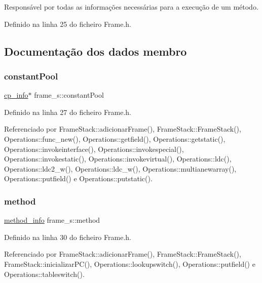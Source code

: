 Responsável por todas as informações necessárias para a execução de um método. 

Definido na linha 25 do ficheiro Frame.\+h.



\subsection{Documentação dos dados membro}
\mbox{\label{structframe__s_a13764e54bdd2ba069584ea6626590efe}} 
\subsubsection{\texorpdfstring{constant\+Pool}{constantPool}}
{\footnotesize\ttfamily \hyperlink{structcp__info}{cp\+\_\+info}$\ast$ frame\+\_\+s\+::constant\+Pool}



Definido na linha 27 do ficheiro Frame.\+h.



Referenciado por Frame\+Stack\+::adicionar\+Frame(), Frame\+Stack\+::\+Frame\+Stack(), Operations\+::func\+\_\+new(), Operations\+::getfield(), Operations\+::getstatic(), Operations\+::invokeinterface(), Operations\+::invokespecial(), Operations\+::invokestatic(), Operations\+::invokevirtual(), Operations\+::ldc(), Operations\+::ldc2\+\_\+w(), Operations\+::ldc\+\_\+w(), Operations\+::multianewarray(), Operations\+::putfield() e Operations\+::putstatic().

\mbox{\label{structframe__s_a2805e18c2a9320c94f2e0e57da95a042}} 
\subsubsection{\texorpdfstring{method}{method}}
{\footnotesize\ttfamily \hyperlink{structmethod__info}{method\+\_\+info} frame\+\_\+s\+::method}



Definido na linha 30 do ficheiro Frame.\+h.



Referenciado por Frame\+Stack\+::adicionar\+Frame(), Frame\+Stack\+::\+Frame\+Stack(), Frame\+Stack\+::inicializar\+P\+C(), Operations\+::lookupswitch(), Operations\+::putfield() e Operations\+::tableswitch().

